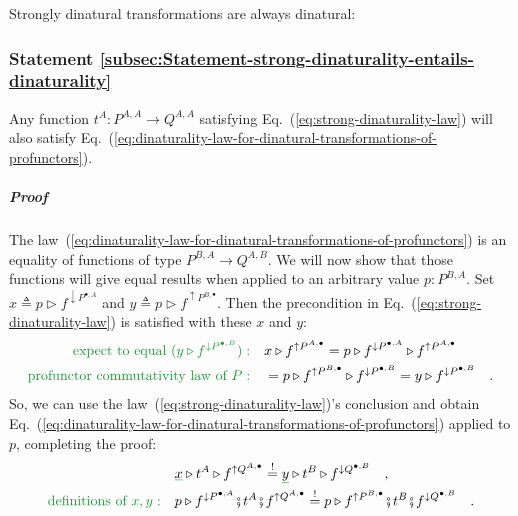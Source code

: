 Strongly dinatural transformations are always dinatural:

\subsubsection{Statement \label{subsec:Statement-strong-dinaturality-entails-dinaturality}\ref{subsec:Statement-strong-dinaturality-entails-dinaturality}}

Any function $t^{A}:P^{A,A}\rightarrow Q^{A,A}$ satisfying Eq.~(\ref{eq:strong-dinaturality-law})
will also satisfy Eq.~(\ref{eq:dinaturality-law-for-dinatural-transformations-of-profunctors}).

\subparagraph{Proof}

The law~(\ref{eq:dinaturality-law-for-dinatural-transformations-of-profunctors})
is an equality of functions of type $P^{B,A}\rightarrow Q^{A,B}$.
We will now show that those functions will give equal results when
applied to an arbitrary value $p:P^{B,A}$. Set $x\triangleq p\triangleright f^{\downarrow P^{\bullet,A}}$
and $y\triangleq p\triangleright f^{\uparrow P^{B,\bullet}}$. Then
the precondition in Eq.~(\ref{eq:strong-dinaturality-law}) is satisfied
with these $x$ and $y$:
\begin{align*}
{\color{greenunder}\text{expect to equal }(y\triangleright f^{\downarrow P^{\bullet,B}}):}\quad & x\triangleright f^{\uparrow P^{A,\bullet}}=p\triangleright f^{\downarrow P^{\bullet,A}}\triangleright f^{\uparrow P^{A,\bullet}}\\
{\color{greenunder}\text{profunctor commutativity law of }P:}\quad & =p\triangleright f^{\uparrow P^{B,\bullet}}\triangleright f^{\downarrow P^{\bullet,B}}=y\triangleright f^{\downarrow P^{\bullet,B}}\quad.
\end{align*}
So, we can use the law~(\ref{eq:strong-dinaturality-law})\textsf{'}s conclusion
and obtain Eq.~(\ref{eq:dinaturality-law-for-dinatural-transformations-of-profunctors})
applied to $p$, completing the proof:
\begin{align*}
 & \gunderline x\triangleright t^{A}\triangleright f^{\uparrow Q^{A,\bullet}}\overset{!}{=}\gunderline y\triangleright t^{B}\triangleright f^{\downarrow Q^{\bullet,B}}\quad,\\
{\color{greenunder}\text{definitions of }x,y:}\quad & p\triangleright f^{\downarrow P^{\bullet,A}}\bef t^{A}\bef f^{\uparrow Q^{A,\bullet}}\overset{!}{=}p\triangleright f^{\uparrow P^{B,\bullet}}\bef t^{B}\bef f^{\downarrow Q^{\bullet,B}}\quad.
\end{align*}

